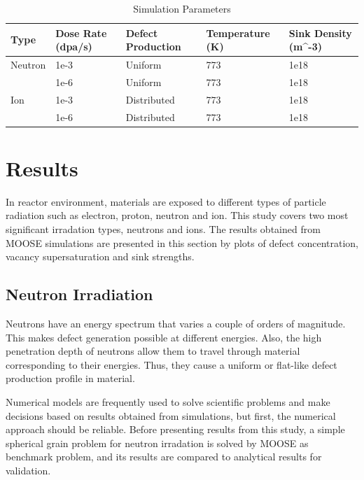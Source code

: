 \documentclass[a4paper]{article}
\begin{document}
\begin{table}[h!]
  \centering
  \caption{Simulation Parameters}
  \label{table:simulation_parameters}
  \begin{tabular}{ ||p{2cm}|p{3cm}|p{3cm}|p{3cm}|p{3cm}||  }
     \hline
     Type & Dose Rate (dpa/s) & Defect Production & Temperature (K) & Sink Density (m^{-3})\\
     \hline
     \hline
     Neutron  & 1e-3  & Uniform     & 773 & 1e18\\
              & 1e-6  & Uniform     & 773 & 1e18\\
     \hline
     Ion      & 1e-3  & Distributed & 773 & 1e18\\
              & 1e-6  & Distributed & 773 & 1e18\\
     \hline
  \end{tabular}
\end{table}

\newpage
\section{Results} \hspace{10pt}

In reactor environment, materials are exposed to different types of particle radiation such as electron, proton, neutron and ion. This study covers two most significant irradation types, neutrons and ions. The results obtained from MOOSE simulations are presented in this section by plots of defect concentration, vacancy supersaturation and sink strengths. %

  \subsection{Neutron Irradiation} \hspace{10pt}
  Neutrons have an energy spectrum that varies a couple of orders of magnitude. This makes defect generation possible at different energies. Also, the high penetration depth of neutrons allow them to travel through material corresponding to their energies. Thus, they cause a uniform or flat-like defect production profile in material.\cite{was2016}

  Numerical models are frequently used to solve scientific problems and make decisions based on results obtained from simulations, but first, the numerical approach should be reliable. Before presenting results from this study, a simple spherical grain problem for neutron irradation is solved by MOOSE as benchmark problem, and its results are compared to analytical results for validation.
\end{document}
